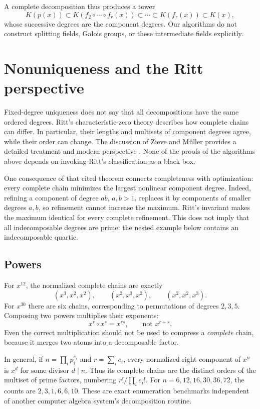 \documentclass[11pt,a4paper]{article}
\numberwithin{equation}{section}
\theoremstyle{definition}
\theoremstyle{remark}
\begin{document}
A complete decomposition thus produces a tower
\[
 K(p(x))\subset K(f_2\circ\cdots\circ f_r(x))
 \subset\cdots\subset K(f_r(x))\subset K(x),
\]
whose successive degrees are the component degrees. Our algorithms do not construct splitting fields, Galois groups, or these intermediate fields explicitly.

\section{Nonuniqueness and the Ritt perspective}
\label{sec:ritt}
Fixed-degree uniqueness does not say that all decompositions have the same
ordered degrees. Ritt's characteristic-zero theory describes how complete
chains can differ. In particular, their lengths and multisets of component
degrees agree, while their order can change. The discussion of Zieve and
M\"uller provides a detailed treatment and modern perspective \cite{ZM}.
None of the proofs of the algorithms above depends on invoking Ritt's
classification as a black box.

One consequence of that cited theorem connects completeness with optimization:
every complete chain minimizes the largest nonlinear component degree.
Indeed, refining a component of degree \(ab\), \(a,b>1\), replaces it by
components of smaller degrees \(a,b\), so refinement cannot increase the
maximum.  Ritt's invariant makes the maximum identical for every complete
refinement.  This does not imply that all indecomposable degrees are prime:
the nested example below contains an indecomposable quartic.

\subsection{Powers}
For $x^{12}$, the normalized complete chains are exactly
\[
 (x^3,x^2,x^2),\qquad (x^2,x^3,x^2),\qquad (x^2,x^2,x^3).
\]
For $x^{30}$ there are six chains, corresponding to permutations of degrees
$2,3,5$. Composing two powers multiplies their exponents:
\begin{equation}
 x^r\circ x^s=x^{rs},\qquad\text{not }x^{r+s}.
 \label{eq:powerproduct}
\end{equation}
Even the correct multiplication should not be used to compress a
\emph{complete} chain, because it merges two atoms into a decomposable factor.

In general, if \(n=\prod_i p_i^{e_i}\) and \(r=\sum_i e_i\), every normalized
right component of \(x^n\) is \(x^d\) for some divisor \(d\mid n\).  Thus its
complete chains are the distinct orders of the multiset of prime factors,
numbering \(r!/\prod_i e_i!\).  For \(n=6,12,16,30,36,72\), the counts are
\(2,3,1,6,6,10\).  These are exact enumeration benchmarks independent of
another computer algebra system's decomposition routine.
\end{document}

